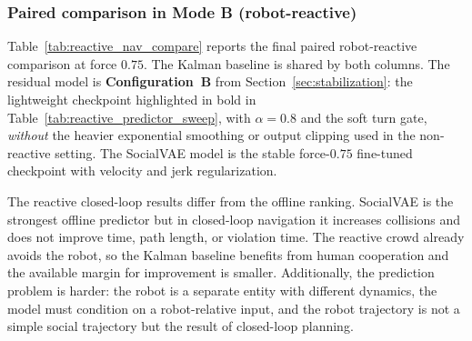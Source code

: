 \documentclass[12pt, a4paper]{article}
\begin{document}
\subsubsection*{Paired comparison in Mode B (robot-reactive)}

Table~\ref{tab:reactive_nav_compare} reports the final paired robot-reactive comparison at force $0.75$. The Kalman baseline is shared by both columns. The residual model is \textbf{Configuration~B} from Section~\ref{sec:stabilization}: the lightweight checkpoint highlighted in bold in Table~\ref{tab:reactive_predictor_sweep}, with $\alpha=0.8$ and the soft turn gate, \emph{without} the heavier exponential smoothing or output clipping used in the non-reactive setting. The SocialVAE model is the stable force-$0.75$ fine-tuned checkpoint with velocity and jerk regularization.

\begin{table}[H]
\centering
\caption{Robot-reactive paired navigation comparison at force $0.75$. Mean $\pm$ std over paired long-corridor episodes. $p$-values are from uncorrected paired Wilcoxon tests, rounded to two decimals.}
\label{tab:reactive_nav_compare}
\end{table}

The reactive closed-loop results differ from the offline ranking. SocialVAE is the strongest offline predictor but in closed-loop navigation it increases collisions and does not improve time, path length, or violation time. The reactive crowd already avoids the robot, so the Kalman baseline benefits from human cooperation and the available margin for improvement is smaller. Additionally, the prediction problem is harder: the robot is a separate entity with different dynamics, the model must condition on a robot-relative input, and the robot trajectory is not a simple social trajectory but the result of closed-loop planning.
\end{document}
